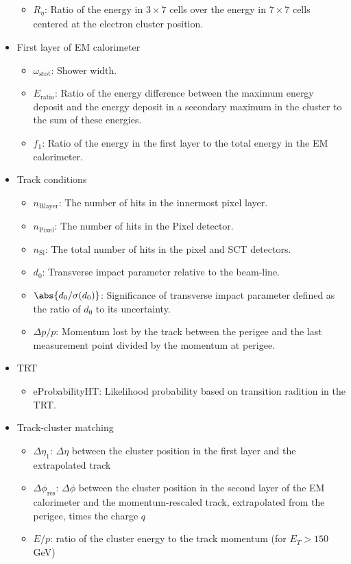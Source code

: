 \begin{itemize}
\begin{itemize}
		      \item $R_{\eta}$: Ratio of the energy in $3\times 7$ cells over the energy in $7\times 7$ cells
		            centered at the electron cluster position.
	      \end{itemize}
	\item First layer of EM calorimeter
	      \begin{itemize}
		      \item $\omega_{\text{stot}}$: Shower width. 
		      \item $E_{\text{ratio}}$: Ratio of the energy difference between the maximum energy deposit 
		      and the energy deposit in a secondary maximum in the cluster to the sum of these energies. 
		      \item $f_1$: Ratio of the energy in the first layer to the total energy in the EM calorimeter. 
	      \end{itemize}
	\item Track conditions
	      \begin{itemize}
		      \item $n_{\text{Blayer}}$: The number of hits in the innermost pixel layer.
		      \item $n_{\text{Pixel}}$: The number of hits in the Pixel detector.
		      \item $n_{\text{Si}}$: The total number of hits in the pixel and SCT detectors.
		      \item $d_0$: Transverse impact parameter relative to the beam-line. 
		      \item $\abs{d_0/ \sigma(d_0)}$: Significance of transverse impact parameter defined 
		      as the ratio of $d_0$ to its uncertainty. 
		      \item $\Delta p / p$: Momentum lost by the track between the perigee and the last 
		      measurement point divided by the momentum at perigee. 
	      \end{itemize}
	\item TRT
	      \begin{itemize}
		      \item eProbabilityHT: Likelihood probability based on transition radition in the TRT. 
	      \end{itemize}
	\item Track-cluster matching
	      \begin{itemize}

		      \item $\Delta\eta_1$: $\Delta \eta$ between the cluster position in the
		            first layer and the extrapolated track

		      \item $\Delta \phi_{\text{res}}$: $\Delta \phi$ between the cluster position 
					in the second layer of the EM calorimeter and the momentum-rescaled track, 
					extrapolated from the perigee, times the charge $q$

		      \item $E/p$: ratio of the cluster energy to the track momentum (for $E_T > 150$ GeV)
	      \end{itemize}
\end{itemize}

